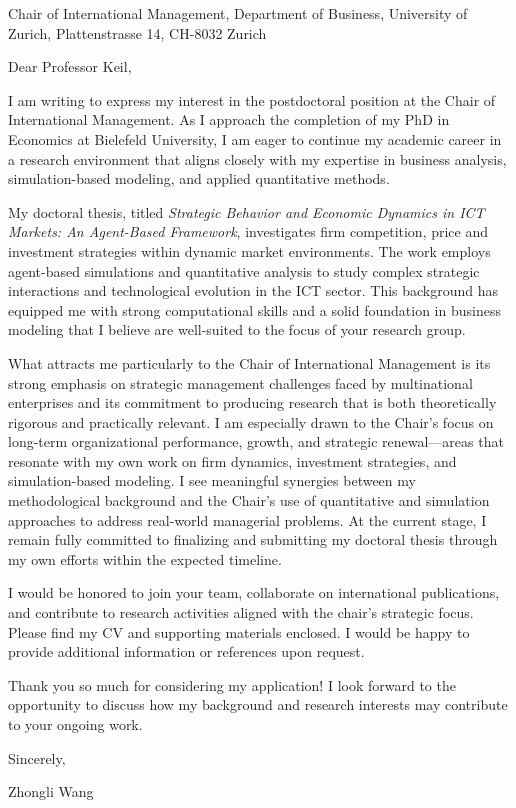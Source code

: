 \documentclass[11pt]{letter}
\date{\today}
\begin{document}
\begin{letter}{Chair of International Management,  Department of Business, 
University of Zurich,
Plattenstrasse 14,
CH-8032 Zurich}

\opening{Dear Professor Keil,}

I am writing to express my interest in the postdoctoral position at the Chair of International Management. As I approach the completion of my PhD in Economics at Bielefeld University, I am eager to continue my academic career in a research environment that aligns closely with my expertise in business analysis, simulation-based modeling, and applied quantitative methods.

My doctoral thesis, titled \textit{Strategic Behavior and Economic Dynamics in ICT Markets: An Agent-Based Framework}, investigates firm competition, price and investment strategies within dynamic market environments. The work employs agent-based simulations and quantitative analysis to study complex strategic interactions and technological evolution in the ICT sector. This background has equipped me with strong computational skills and a solid foundation in business modeling that I believe are well-suited to the focus of your research group.

What attracts me particularly to the Chair of International Management is its strong emphasis on strategic management challenges faced by multinational enterprises and its commitment to producing research that is both theoretically rigorous and practically relevant. I am especially drawn to the Chair’s focus on long-term organizational performance, growth, and strategic renewal—areas that resonate with my own work on firm dynamics, investment strategies, and simulation-based modeling. I see meaningful synergies between my methodological background and the Chair’s use of quantitative and simulation approaches to address real-world managerial problems. At the current stage, I remain fully committed to finalizing and submitting my doctoral thesis through my own efforts within the expected timeline.

I would be honored to join your team, collaborate on international publications, and contribute to research activities aligned with the chair’s strategic focus. Please find my CV and supporting materials enclosed. I would be happy to provide additional information or references upon request. 

Thank you so much for considering my application! I look forward to the opportunity to discuss how my background and research interests may contribute to your ongoing work.
\vspace{1em}


Sincerely,

\vspace{10mm}
Zhongli Wang

\end{letter}
\end{document}
